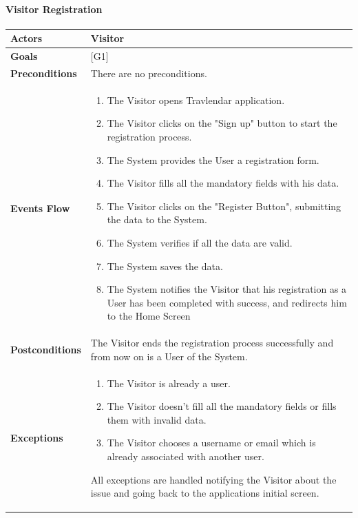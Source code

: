 \documentclass[12pt]{article}
\begin{document}
\paragraph{Visitor Registration}

\begin{center}
    \begin{tabular} { |p{}|p{}| }
        \hline
        \textbf{Actors} & Visitor \\ 
        \hline
        \textbf{Goals} & {[G1]} \\ 
        \hline  
        \textbf{Preconditions} & There are no preconditions. \\ 
        \hline
        \textbf{Events Flow} & \begin{enumerate}[topsep=0pt]
                            \setlength{\itemsep}{0.5pt}
                            \item The Visitor opens Travlendar application.
                            \item The Visitor clicks on the "Sign up" button to start the registration process.
                            \item The System provides the User a registration form.
                            \item The Visitor fills all the mandatory fields with his data. 
                            \item The Visitor clicks on the "Register Button", submitting the data to the System.
                            \item The System verifies if all the data are valid.
                            \item The System saves the data.
                            \item The System notifies the Visitor that his registration as a User has been completed with success, and redirects him to the Home Screen
                            \end{enumerate} \\
        \hline
        \textbf{Postconditions} & The Visitor ends the registration process successfully and from now on is a User of the System. \\
        \hline
        \textbf{Exceptions} & \begin{enumerate}[topsep=0pt]
                            \setlength{\itemsep}{0.5pt}
                            \item The Visitor is already a user. 
                            \item The Visitor doesn't fill all the mandatory fields or fills them with invalid data.
                            \item The Visitor chooses a username or email which is already associated with another user.
                            \end{enumerate} 
                            All exceptions are handled notifying the Visitor about the issue and going back to the applications initial screen.\\ 
        \hline
    \end{tabular}
\end{center}
\end{document}
